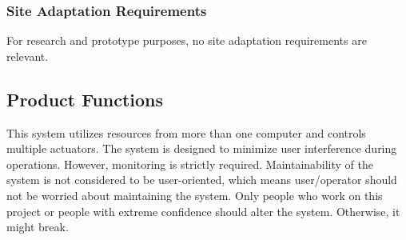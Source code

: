 \documentclass[compsoc,draftclsnofoot,onecolumn,10pt]{IEEEtran}
\begin{document}
\subsubsection{Site Adaptation Requirements}
For research and prototype purposes, no site adaptation requirements are relevant. 

\subsection{Product Functions} %
This system utilizes resources from more than one computer and controls multiple
actuators. The system is designed to minimize user interference during operations.
However, monitoring is strictly required. 
Maintainability of the system is not considered to be user-oriented, which means 
user/operator should not be worried about maintaining the system. Only people who 
work on this project or people with extreme confidence should alter the 
system. Otherwise, it might break. 
%
\end{document}
